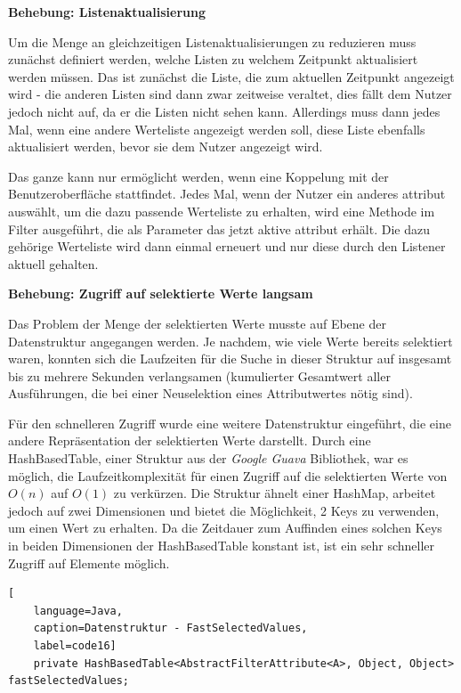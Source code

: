 \textbf{Behebung: Listenaktualisierung}

Um die Menge an gleichzeitigen Listenaktualisierungen zu reduzieren muss zunächst definiert werden, welche Listen zu welchem Zeitpunkt aktualisiert werden müssen. Das ist zunächst die Liste, die zum aktuellen Zeitpunkt angezeigt wird - die anderen Listen sind dann zwar zeitweise veraltet, dies fällt dem Nutzer jedoch nicht auf, da er die Listen nicht sehen kann. Allerdings muss dann jedes Mal, wenn eine andere Werteliste angezeigt werden soll, diese Liste ebenfalls aktualisiert werden, bevor sie dem Nutzer angezeigt wird.

Das ganze kann nur ermöglicht werden, wenn eine Koppelung mit der Benutzeroberfläche stattfindet. Jedes Mal, wenn der Nutzer ein anderes \gls{attribut} auswählt, um die dazu passende Werteliste zu erhalten, wird eine Methode im Filter ausgeführt, die als Parameter das jetzt aktive \gls{attribut} erhält. Die dazu gehörige Werteliste wird dann einmal erneuert und nur diese durch den Listener aktuell gehalten.

\textbf{Behebung: Zugriff auf selektierte Werte langsam}

Das Problem der Menge der selektierten Werte musste auf Ebene der Datenstruktur angegangen werden. Je nachdem, wie viele Werte bereits selektiert waren, konnten sich die Laufzeiten für die Suche in dieser Struktur auf insgesamt bis zu mehrere Sekunden verlangsamen (kumulierter Gesamtwert aller Ausführungen, die bei einer Neuselektion eines Attributwertes nötig sind).

Für den schnelleren Zugriff wurde eine weitere Datenstruktur eingeführt, die eine andere Repräsentation der selektierten Werte darstellt. Durch eine HashBasedTable, einer Struktur aus der \textit{Google Guava} Bibliothek, war es möglich, die Laufzeitkomplexität für einen Zugriff auf die selektierten Werte von $O(n)$ auf $O(1)$ zu verkürzen. Die Struktur ähnelt einer HashMap, arbeitet jedoch auf zwei Dimensionen und bietet die Möglichkeit, 2 Keys zu verwenden, um einen Wert zu erhalten. Da die Zeitdauer zum Auffinden eines solchen Keys in beiden Dimensionen der HashBasedTable konstant ist, ist ein sehr schneller Zugriff auf Elemente möglich.

\begin{lstlisting}[
    language=Java,
    caption=Datenstruktur - FastSelectedValues,
    label=code16]
	private HashBasedTable<AbstractFilterAttribute<A>, Object, Object> fastSelectedValues;
\end{lstlisting}

